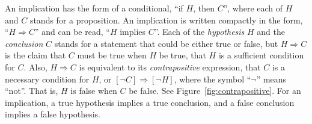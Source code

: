 An implication has the form of a conditional, ``if $H$, then $C$'', where each
of $H$ and $C$ stands for a proposition.  An implication is written compactly
in the form, ``$H \Rightarrow C$'' and can be read, ``$H$ implies $C$''.  Each
of the \emph{hypothesis} $H$ and the \emph{conclusion} $C$ stands for a
statement that could be either true or false, but $H \Rightarrow C$ is the
claim that $C$ must be true when $H$ be true, that $H$ is a sufficient
condition for $C$. Also, $H \Rightarrow C$ is equivalent to its
\emph{contrapositive} expression, that $C$ is a necessary condition for $H$, or
$[\lnot C] \Rightarrow [\lnot H]$, where the symbol ``$\lnot$'' means ``not''.
That is, $H$ is false when $C$ be false. See Figure~\ref{fig:contrapositive}.
For an implication, a true hypothesis implies a true conclusion, and a false
conclusion implies a false hypothesis.

